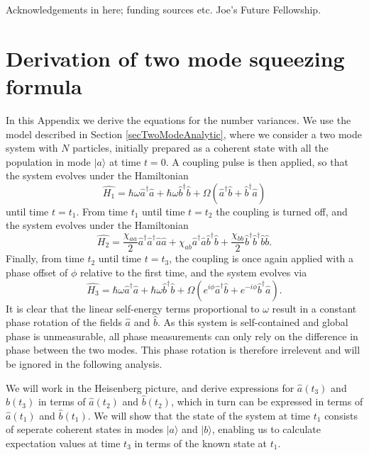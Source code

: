 \documentclass{iopart}
\begin{document}
\ack
Acknowledgements in here; funding sources etc.  Joe's Future Fellowship.  

\clearpage

\appendix
\section{Derivation of two mode squeezing formula}
\label{appendixTwoModeDerivation}
In this Appendix we derive the equations for the number variances. We use the model described in Section \ref{secTwoModeAnalytic}, where we consider a two mode system with $N$ particles, initially prepared as a coherent state with all the population in mode $|a\rangle$ at time $t=0$. A coupling pulse is then applied, so that the system evolves under the Hamiltonian
\begin{equation}
\hat{H_1} = \hbar \omega \hat{a}^{\dagger} \hat{a} +  \hbar \omega \hat{b}^{\dagger} \hat{b} 
          + \Omega (\hat{a}^{\dagger} \hat{b} + \hat{b}^{\dagger} \hat{a} )
\end{equation}
until time $t=t_1$. From time $t_1$ until time $t=t_2$ the coupling is turned off, and the system evolves under the Hamiltonian
\begin{equation}
\hat{H_2} = \frac{\chi_{aa}}{2} \hat{a}^{\dagger} \hat{a}^{\dagger} \hat{a} \hat{a}
          + \chi_{ab} \hat{a}^{\dagger} \hat{a} \hat{b}^{\dagger} \hat{b}
          + \frac{\chi_{bb}}{2} \hat{b}^{\dagger} \hat{b}^{\dagger} \hat{b} \hat{b}.
\end{equation}
Finally, from time $t_2$ until time $t=t_3$, the coupling is once again applied with a phase offset of $\phi$ relative to the first time, and the system evolves via
\begin{equation}
\hat{H_3} = \hbar \omega \hat{a}^{\dagger} \hat{a} +  \hbar \omega \hat{b}^{\dagger} \hat{b}
          + \Omega (e^{i\phi} \hat{a}^{\dagger} \hat{b} + e^{-i\phi} \hat{b}^{\dagger} \hat{a} ).
\end{equation}
It is clear that the linear self-energy terms proportional to $\omega$ result in a constant phase rotation of the fields $\hat{a}$ and $\hat{b}$. As this system is self-contained and global phase is unmeasurable, all phase measurements can only rely on the difference in phase between the two modes. This phase rotation is therefore irrelevent and will be ignored in the following analysis.

We will work in the Heisenberg picture, and derive expressions for $\hat{a}(t_3)$ and $\hat{b}(t_3)$ in terms of $\hat{a}(t_2)$ and $\hat{b}(t_2)$, which in turn can be expressed in terms of $\hat{a}(t_1)$ and $\hat{b}(t_1)$. We will show that the state of the system at time $t_1$ consists of seperate coherent states in modes $|a\rangle$ and $|b\rangle$, enabling us to calculate expectation values at time $t_3$ in terms of the known state at $t_1$.
\end{document}
